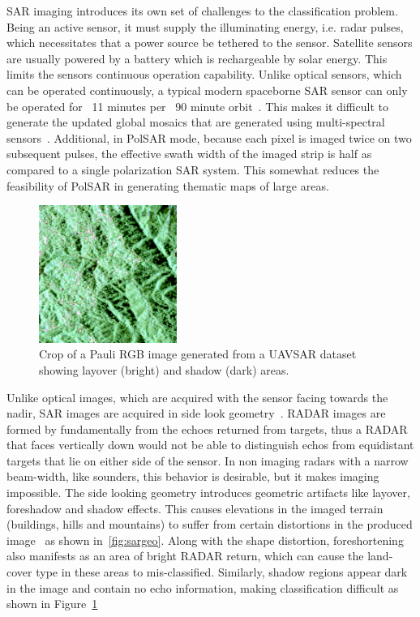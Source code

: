 SAR imaging introduces its own set of challenges to the classification problem. Being an active sensor, it must supply the illuminating energy, i.e. radar pulses, which necessitates that a power source be tethered to the sensor. Satellite sensors are usually powered by a battery which is rechargeable by solar energy. This limits the sensors continuous operation capability. Unlike optical sensors, which can be operated continuously, a typical modern spaceborne SAR sensor can only be operated for ~11 minutes per ~90 minute orbit~\cite{simpson2004terrasar}. This makes it difficult to generate the updated global mosaics that are generated using multi-spectral sensors~\cite{stockli2005blue}. Additional, in PolSAR mode, because each pixel is imaged twice on two subsequent pulses, the effective swath width of the imaged strip is half as compared to a single polarization SAR system. This somewhat reduces the feasibility of PolSAR in generating thematic maps of large areas. 

	\begin{figure}[tbp]
	\centering
	\includegraphics[width=0.4\textwidth]{Figures/shadow}
	\caption{Crop of a Pauli RGB image generated from a UAVSAR dataset showing layover (bright) and shadow (dark) areas.  }
	\label{fig:sarshadow}
	\end{figure}
	


Unlike optical images, which are acquired with the sensor facing towards the nadir, SAR images are acquired in side look geometry~\cite{lee2009polarimetric}. RADAR images are formed by fundamentally from the echoes returned from targets, thus a RADAR that faces vertically down would not be able to distinguish echos from equidistant targets that lie on either side of the sensor. In non imaging radars with a narrow beam-width, like sounders, this behavior is desirable, but it makes imaging impossible. The side looking geometry introduces geometric artifacts like layover, foreshadow and shadow effects. This causes elevations in the imaged terrain (buildings, hills and mountains) to suffer from certain distortions in the produced image~\cite[21]{van2011synthetic} as shown in~\ref{fig:sargeo}. Along with the shape distortion, foreshortening also manifests as an area of bright RADAR return, which can cause the land-cover type in these areas to mis-classified. Similarly, shadow regions appear dark in the image and contain no echo information, making classification difficult as shown in Figure~\ref{fig:sarshadow}

